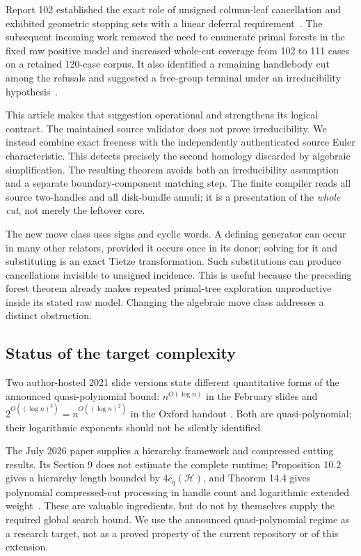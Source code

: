 Report 102 established the exact role of unsigned column-leaf cancellation
and exhibited geometric stopping sets with a linear deferral
requirement~\cite{Report102}. The subsequent incoming work removed the need to
enumerate primal forests in the fixed raw positive model and increased
whole-cut coverage from 102 to 111 cases on a retained 120-case corpus. It also
identified a remaining handlebody cut among the refusals and suggested a
free-group terminal under an irreducibility hypothesis~\cite{DeferredForests}.

This article makes that suggestion operational and strengthens its logical
contract. The maintained source validator does not prove irreducibility. We
instead combine exact freeness with the independently authenticated source
Euler characteristic. This detects precisely the second homology discarded
by algebraic simplification. The resulting theorem avoids both an
irreducibility assumption and a separate boundary-component matching step.
The finite compiler reads all source two-handles and all disk-bundle annuli;
it is a presentation of the \emph{whole cut}, not merely the leftover core.

The new move class uses signs and cyclic words. A defining generator can occur
in many other relators, provided it occurs once in its donor; solving for it
and substituting is an exact Tietze transformation. Such substitutions can
produce cancellations invisible to unsigned incidence. This is useful because
the preceding forest theorem already makes repeated primal-tree exploration
unproductive inside its stated raw model. Changing the algebraic move class
addresses a distinct obstruction.

\subsection{Status of the target complexity}

Two author-hosted 2021 slide versions state different quantitative forms of
the announced quasi-polynomial bound: $n^{O(\log n)}$ in the February slides
and $2^{O((\log n)^3)}=n^{O((\log n)^2)}$ in the Oxford handout
\cite{Lackenby2021,LackenbyOxford2021}. Both are quasi-polynomial; their
logarithmic exponents should not be silently identified.

The July 2026 paper supplies a hierarchy framework and compressed cutting
results. Its Section 9 does not estimate the complete runtime; Proposition
10.2 gives a hierarchy length bounded by $4c_q(\mathcal H)$, and Theorem 14.4
gives polynomial compressed-cut processing in handle count and logarithmic
extended weight~\cite{Lackenby2026}. These are valuable ingredients, but do not
by themselves supply the required global search bound. We use the announced
quasi-polynomial regime as a research target, not as a proved property of the
current repository or of this extension.

